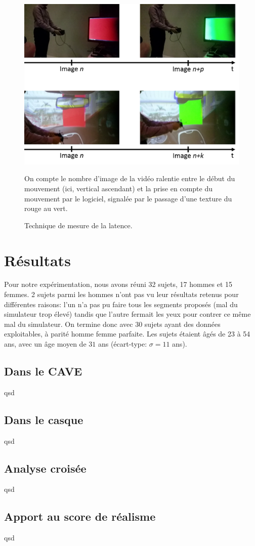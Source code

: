 	\begin{figure}
		\centering
		\includegraphics[scale=.8]{Figures/LatencyMeasureTechnique}
		\caption{Technique de mesure de la latence.}{On compte le nombre d'image de la vidéo ralentie entre le début du mouvement (ici, vertical ascendant) et la prise en compte du mouvement par le logiciel, signalée par le passage d'une texture du rouge au vert.}
		\label{fig:mesure_latence_video}
	\end{figure}
	
\chapter{Résultats}
	\par Pour notre expérimentation, nous avons réuni 32 sujets, 17 hommes et 15 femmes. 2 sujets parmi les hommes n'ont pas vu leur résultats retenus pour différentes raisons: l'un n'a pas pu faire tous les segments proposés (mal du simulateur trop élevé) tandis que l'autre fermait les yeux pour contrer ce même mal du simulateur. On termine donc avec 30 sujets ayant des données exploitables, à parité homme femme parfaite. Les sujets étaient âgés de 23 à 54 ans, avec un âge moyen de $31$ ans (écart-type: $\sigma = 11$ ans).

	
	\section{Dans le CAVE}
	\par qsd
	
	\section{Dans le casque}
	\par qsd
	
	\section{Analyse croisée}
	\par qsd
	
	\section{Apport au score de réalisme}
	\par qsd
